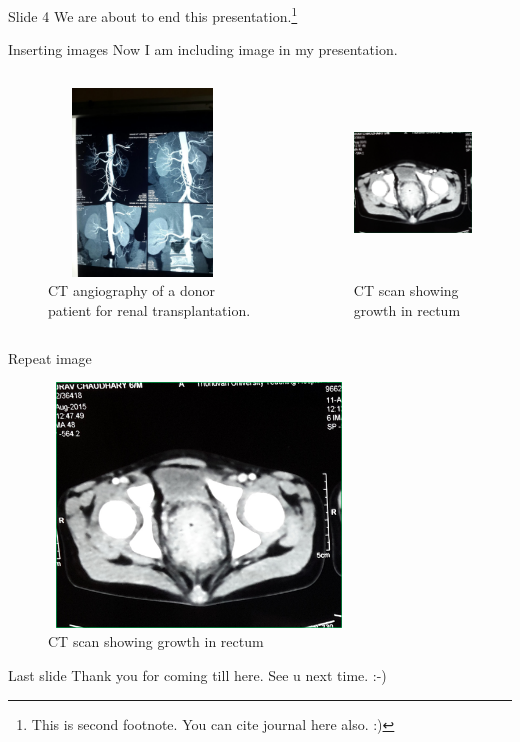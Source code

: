 \documentclass[12pt]{beamer}
\begin{document}
\begin{frame}{Slide 4}
We are about to end this presentation.\footnote{This is second footnote. You can cite journal here also. :)}
\end{frame}

\begin{frame}{Inserting images}
Now I am including image in my presentation.
 
\begin{columns}
	\column[]{0.5\paperwidth}
	\begin{figure}
		\includegraphics[height=50mm, width=50mm]{yasoda.jpg}
		\caption{CT angiography of a donor patient for renal transplantation.}
	\end{figure}
   \column[]{0.5\paperwidth}
   \begin{figure}
   	\includegraphics[height=50mm, width=50mm]{Picture1.png}
   	\caption{CT scan showing growth in rectum}
   \end{figure}
\end{columns}

\end{frame}

\begin{frame}{Repeat image}
\begin{figure}
	\includegraphics[height=65mm, width=80mm]{Picture1.png}
	\caption{CT scan showing growth in rectum}
\end{figure}
\end{frame}

\begin{frame}{Last slide}
	\centering \Huge Thank you for coming till here. See u next time. {:-)}	
\end{frame}
\end{document}
